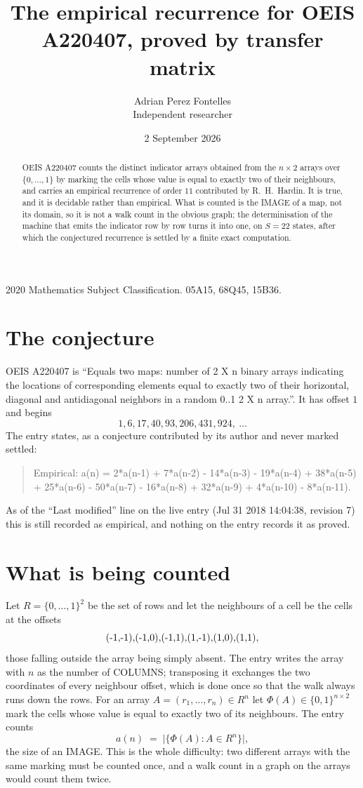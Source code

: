 \documentclass[11pt,a4paper]{article}
\title{The empirical recurrence for OEIS A220407, proved by transfer matrix}
\author{Adrian Perez Fontelles\\ \small Independent researcher}
\date{2 September 2026}
\theoremstyle{plain}
\theoremstyle{definition}
\begin{document}
\maketitle

\begin{abstract}
OEIS A220407 counts the distinct indicator arrays obtained from the $n\times2$ arrays over
$\{0,\dots,1\}$ by marking the cells whose value is equal to exactly two of their neighbours, and carries an
empirical recurrence of order $11$ contributed by R.~H.~Hardin. It is true, and it is
decidable rather than empirical. What is counted is the IMAGE of a map, not its domain, so it
is not a walk count in the obvious graph; the determinisation of the machine that emits the
indicator row by row turns it into one, on $S=22$ states, after which the conjectured
recurrence is settled by a finite exact computation.
\end{abstract}

\noindent\small 2020 Mathematics Subject Classification. 05A15, 68Q45, 15B36.\normalsize

\section{The conjecture}

OEIS A220407 is ``Equals two maps: number of 2 X n binary arrays indicating the locations of corresponding elements equal to exactly two of their horizontal, diagonal and antidiagonal neighbors in a random 0..1 2 X n array.''. It has offset $1$ and begins
\[
1, 6, 17, 40, 93, 206, 431, 924,\ \dots
\]
The entry states, as a conjecture contributed by its author and never marked settled:
\begin{quote}
Empirical: a(n) = 2*a(n-1) + 7*a(n-2) - 14*a(n-3) - 19*a(n-4) + 38*a(n-5) + 25*a(n-6) - 50*a(n-7) - 16*a(n-8) + 32*a(n-9) + 4*a(n-10) - 8*a(n-11).
\end{quote}
As of the ``Last modified'' line on the live entry (Jul 31 2018 14:04:38, revision 7) this is still
recorded as empirical, and nothing on the entry records it as proved.

\section{What is being counted}

Let $R=\{0,\dots,1\}^{2}$ be the set of rows and let the neighbours of a cell be the
cells at the offsets
\[
$(-1,-1)$, $(-1,0)$, $(-1,1)$, $(1,-1)$, $(1,0)$, $(1,1)$,
\]
those falling outside the array being simply absent. The entry writes the array with $n$ as the number of COLUMNS; transposing it exchanges the two coordinates of every neighbour offset, which is done once so that the walk always runs down the rows. For an array
$A=(r_1,\dots,r_n)\in R^n$ let $\Phi(A)\in\{0,1\}^{n\times2}$ mark the cells whose value
is equal to exactly two of its neighbours. The entry counts
\[
a(n)\;=\;\bigl|\{\Phi(A):A\in R^n\}\bigr| ,
\]
the size of an IMAGE. This is the whole difficulty: two different arrays with the same marking
must be counted once, and a walk count in a graph on the arrays would count them twice.
\end{document}
